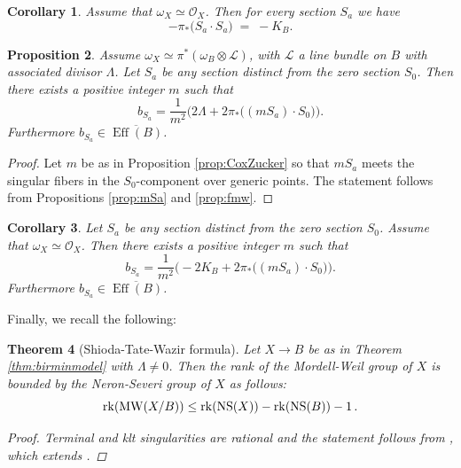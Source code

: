 \documentclass[11pt]{amsart}
\newtheorem{theorem}{Theorem}[section]
\newtheorem{proposition}[theorem]{Proposition}
\newtheorem{corollary}[theorem]{Corollary}
\theoremstyle{definition}
\theoremstyle{definition}
\theoremstyle{remark}
\theoremstyle{remark}
\theoremstyle{definition}
\theoremstyle{conjecture}
\newcommand{\NS}{\mathrm{NS}}
\newcommand{\MW}{\mathrm{MW}}
\begin{document}
\begin{corollary}\label{cor:fmw}
\label{prop:kx-sigma}
  Assume  that $\omega_X \simeq \mathcal{O}_X$.  Then for every section $S_a$ we have
  \[
    -\pi_*\bigl( S_a \cdot S_a\bigr) \;=\; -K_B.
  \]
\end{corollary}


\begin{proposition}\label{prop:bsa}Assume $\omega_X \simeq \pi^*(\omega_B \otimes  \mathcal{L})$,  with $\mathcal{L}$ a line bundle on $B$ with associated divisor $\Lambda$. Let $S_a$ be any section distinct from the zero section $S_0$.  Then there exists a positive integer $m$ such that
	\[
	b_{S_a}
	= \frac{1}{m^2}\Big(2 \Lambda + 2\pi_*\bigl((mS_a)\cdot S_0\bigr)\Big).
	\]
   Furthermore $b_{S_a} \in \overline{\operatorname{Eff}(B)}$.
	
\end{proposition}
\begin{proof}
  Let  $m$ be as in  Proposition \ref{prop:CoxZucker} so that $mS_a$ meets the singular fibers in the $S_0$-component over generic points. The statement follows from Propositions \ref{prop:mSa} and \ref{prop:fmw}.\end{proof}
\begin{corollary}\label{cor:bsa} Let $S_a$ be any section distinct from the zero section $S_0$.  Assume that $\omega_X \simeq \mathcal{O}_X$.  Then there exists a positive integer $m$ such that
  \[
    b_{S_a}
    = \frac{1}{m^2}\Big(-2K_B + 2\pi_*\bigl((mS_a)\cdot S_0\bigr)\Big).
  \]
Furthermore $b_{S_a} \in \overline{\operatorname{Eff}(B)}$.
\end{corollary}


Finally, we recall the following:

\begin{theorem}[Shioda-Tate-Wazir formula] \label{thmSTW} Let $X\to B $ be as in Theorem \ref{thm:birminmodel} with $\Lambda \neq 0$. Then
 the rank of the Mordell-Weil group of $X$ is bounded by the Neron-Severi group of $X$ as follows:
\begin{equation}
{\rm rk}(\MW(X/B)) \leq  {\rm rk}(\NS(X))- {\rm rk}(\NS(B)) -1 \,.
\end{equation}

\begin{proof}  Terminal and klt singularities are rational and the statement follows from \cite[Theorem 1.1]{OguisoOnShiodaWazir}, which extends \cite{Shioda1990, Wazir_2004}.\end{proof}

\end{theorem}
\end{document}
